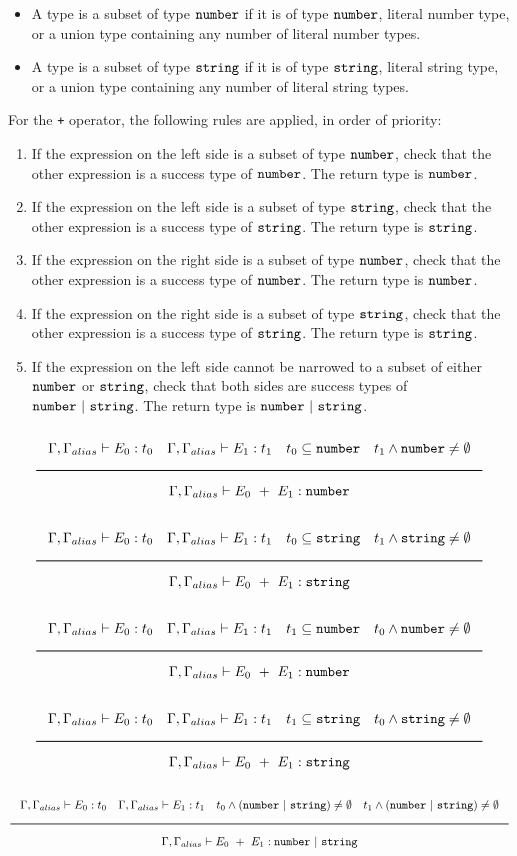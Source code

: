 \begin{itemize}
\item{A type is a subset of type $\texttt{number}$ if it is of type $\texttt{number}$, literal number type,
  or a union type containing any number of literal number types.}
\item{A type is a subset of type $\texttt{string}$ if it is of type $\texttt{string}$, literal string type,
  or a union type containing any number of literal string types.}
\end{itemize}

For the \texttt{+} operator, the following rules are applied, in order of priority:

\begin{enumerate}
\item{If the expression on the left side is a subset of type $\texttt{number}$,
  check that the other expression is a success type of $\texttt{number}$. The return type is $\texttt{number}$.}
\item{If the expression on the left side is a subset of type $\texttt{string}$,
  check that the other expression is a success type of $\texttt{string}$. The return type is $\texttt{string}$.}
\item{If the expression on the right side is a subset of type $\texttt{number}$,
  check that the other expression is a success type of $\texttt{number}$. The return type is $\texttt{number}$.}
\item{If the expression on the right side is a subset of type $\texttt{string}$,
  check that the other expression is a success type of $\texttt{string}$. The return type is $\texttt{string}$.}
\item{If the expression on the left side cannot be narrowed to a subset of either $\texttt{number}$ or $\texttt{string}$, check that both sides are success types of 
  $\Number\ |\ \String$. The return type is $\Number\ |\ \String$.}
\end{enumerate}

\noindent
\[
  \Rule{\Gamma, \Gamma_{alias} \vdash E_0 : t_0 \quad \Gamma, \Gamma_{alias} \vdash E_1 : t_1 \quad t_0 \subseteq \Number
    \quad t_1 \wedge \Number \neq \emptyset}{\Gamma, \Gamma_{alias} \vdash E_0\ + \ E_1 : \Number}
\]
\noindent
\[
  \Rule{\Gamma, \Gamma_{alias} \vdash E_0 : t_0 \quad \Gamma, \Gamma_{alias} \vdash E_1 : t_1 \quad t_0 \subseteq \String
    \quad t_1 \wedge \String \neq \emptyset}{\Gamma, \Gamma_{alias} \vdash E_0\ + \ E_1 : \String}
\]
\noindent
\[
  \Rule{\Gamma, \Gamma_{alias} \vdash E_0 : t_0 \quad \Gamma, \Gamma_{alias} \vdash E_1 : t_1 \quad t_1 \subseteq \Number
    \quad t_0 \wedge \Number \neq \emptyset}{\Gamma, \Gamma_{alias} \vdash E_0\ + \ E_1 : \Number}
\]
\noindent
\[
  \Rule{\Gamma, \Gamma_{alias} \vdash E_0 : t_0 \quad \Gamma, \Gamma_{alias} \vdash E_1 : t_1 \quad t_1 \subseteq \String
    \quad t_0 \wedge \String \neq \emptyset}{\Gamma, \Gamma_{alias} \vdash E_0\ + \ E_1 : \String}
\]
\noindent
\[
  \Rule{\Gamma, \Gamma_{alias} \vdash E_0 : t_0 \quad \Gamma, \Gamma_{alias} \vdash E_1 : t_1 \quad t_0 \wedge (\Number\ |\ \String) \neq \emptyset
    \quad t_1 \wedge (\Number\ |\ \String) \neq \emptyset}{\Gamma, \Gamma_{alias} \vdash E_0\ + \ E_1 : \Number\ |\ \String}
\]
\noindent

